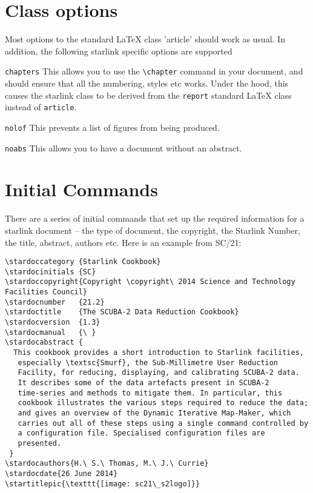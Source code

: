 \documentclass[twoside,11pt,nolof]{starlink}
\begin{document}
\section{Class options}
\label{sec:class-options}
Most options to the standard LaTeX class 'article' should work as
usual. In addition, the following starlink specific options are
supported
\begin{aligndesc}
\item[\texttt{chapters}] This allows you to use the \verb+\chapter+
  command in your document, and should ensure that all the numbering,
  styles etc works. Under the hood, this causes the starlink class to
  be derived from the \texttt{report} standard LaTeX class instead of
  \texttt{article}.
\item[\texttt{nolof}] This prevents a list of figures from being produced.
\item[\texttt{noabs}] This allows you to have a document without an
  abstract.
\end{aligndesc}
\section{Initial Commands}

There are a series of initial commands that set up the required
information for a starlink document -- the type of document, the
copyright, the Starlink Number, the title, abstract, authors etc. Here
is an example from SC/21:

\begin{verbatim}
\stardoccategory {Starlink Cookbook}
\stardocinitials {SC}
\stardoccopyright{Copyright \copyright\ 2014 Science and Technology Facilities Council}
\stardocnumber   {21.2}
\stardoctitle    {The SCUBA-2 Data Reduction Cookbook}
\stardocversion  {1.3}
\stardocmanual   {\ }
\stardocabstract {
  This cookbook provides a short introduction to Starlink facilities,
   especially \textsc{Smurf}, the Sub-Millimetre User Reduction
   Facility, for reducing, displaying, and calibrating SCUBA-2 data.
   It describes some of the data artefacts present in SCUBA-2
   time-series and methods to mitigate them. In particular, this
   cookbook illustrates the various steps required to reduce the data;
   and gives an overview of the Dynamic Iterative Map-Maker, which
   carries out all of these steps using a single command controlled by
   a configuration file. Specialised configuration files are
   presented.
 }
\stardocauthors{H.\ S.\ Thomas, M.\ J.\ Currie}
\stardocdate{26 June 2014}
\startitlepic{\texttt{[image: sc21\_s2logo]}}
\end{verbatim}
\end{document}
